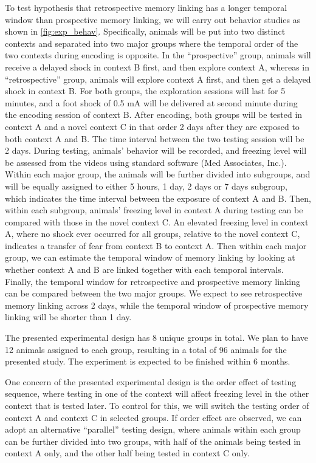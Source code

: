 \documentclass[master.tex]{subfiles}
\begin{document}
To test hypothesis that retrospective memory linking has a longer temporal
window than prospective memory linking, we will carry out behavior studies as
shown in \autoref{fig:exp_behav}. Specifically, animals will be put into two
distinct contexts and separated into two major groups where the temporal order
of the two contexts during encoding is opposite. In the ``prospective'' group,
animals will receive a delayed shock in context B first, and then explore
context A, whereas in ``retrospective'' group, animals will explore context A
first, and then get a delayed shock in context B. For both groups, the
exploration sessions will last for 5 minutes, and a foot shock of 0.5 mA will be
delivered at second minute during the encoding session of context B. After
encoding, both groups will be tested in context A and a novel context C in that
order 2 days after they are exposed to both context A and B. The time interval
between the two testing session will be 2 days. During testing, animals'
behavior will be recorded, and freezing level will be assessed from the videos
using standard software (Med Associates, Inc.). Within each major group, the
animals will be further divided into subgroups, and will be equally assigned to
either 5 hours, 1 day, 2 days or 7 days subgroup, which indicates the time
interval between the exposure of context A and B. Then, within each subgroup,
animals' freezing level in context A during testing can be compared with those
in the novel context C. An elevated freezing level in context A, where no shock
ever occurred for all groups, relative to the novel context C, indicates a
transfer of fear from context B to context A. Then within each major group, we
can estimate the temporal window of memory linking by looking at whether context
A and B are linked together with each temporal intervals. Finally, the temporal
window for retrospective and prospective memory linking can be compared between
the two major groups. We expect to see retrospective memory linking across 2
days, while the temporal window of prospective memory linking will be shorter
than 1 day.

The presented experimental design has 8 unique groups in total. We plan to have
12 animals assigned to each group, resulting in a total of 96 animals for the
presented study. The experiment is expected to be finished within 6 months.

One concern of the presented experimental design is the order effect of testing
sequence, where testing in one of the context will affect freezing level in the
other context that is tested later. To control for this, we will switch the
testing order of context A and context C in selected groups. If order effect are
observed, we can adopt an alternative ``parallel'' testing design, where animals
within each group can be further divided into two groups, with half of the
animals being tested in context A only, and the other half being tested in
context C only.
\end{document}
